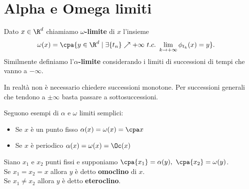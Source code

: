 \section{Alpha e Omega limiti}
\begin{definition}
Dato $x\in\R^d$ chiamiamo \textbf{$\omega$-limite} di $x$ l'insieme
\[\omega(x)=\cpa{y\in\R^d\mid \exists \{t_n\}\nearrow +\infty\ t.c.\ \lim_{k\to+\infty}\phi_{t_k}(x)=y}.\]
Similmente definiamo l'\textbf{$\alpha$-limite} considerando i limiti di successioni di tempi che vanno a $-\infty$.
\end{definition}
\begin{remark}
In realt\`a non \`e necessario chiedere successioni monotone. Per successioni generali che tendono a $\pm\infty$ basta passare a sottosuccessioni.
\end{remark}

\begin{example}
Seguono esempi di $\alpha$ e $\omega$ limiti semplici:
\begin{itemize}
\item Se $x$ \`e un punto fisso $\alpha(x)=\omega(x)=\cpa x$
\item Se $x$ \`e periodico $\alpha(x)=\omega(x)=\Oc(x)$
\end{itemize}
\end{example}

\begin{definition}
Siano $x_1$ e $x_2$ punti fissi e supponiamo $\cpa{x_1}=\alpha(y),\ \cpa{x_2}=\omega(y)$.\\ 
Se $x_1=x_2=x$ allora $y$ \`e detto \textbf{omoclino} di $x$.\\
Se $x_1\neq x_2$ allora $y$ \`e detto \textbf{eteroclino}.
\end{definition}

